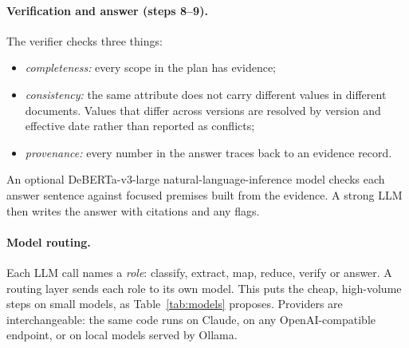 \documentclass[11pt,letterpaper,oneside]{report}
\begin{document}
\paragraph{Verification and answer (steps 8--9).}
The verifier checks three things:
\begin{itemize}
  \item \emph{completeness:} every scope in the plan has evidence;
  \item \emph{consistency:} the same attribute does not carry different
  values in different documents. Values that differ across versions are
  resolved by version and effective date rather than reported as conflicts;
  \item \emph{provenance:} every number in the answer traces back to an
  evidence record.
\end{itemize}
An optional DeBERTa-v3-large natural-language-inference model checks each
answer sentence against focused premises built from the evidence. A strong
LLM then writes the answer with citations and any flags.

\paragraph{Model routing.}
Each LLM call names a \emph{role}: classify, extract, map, reduce, verify or
answer. A routing layer sends each role to its own model. This puts the
cheap, high-volume steps on small models, as Table~\ref{tab:models}
proposes. Providers are interchangeable: the same code runs on Claude, on
any OpenAI-compatible endpoint, or on local models served by Ollama.
\end{document}
